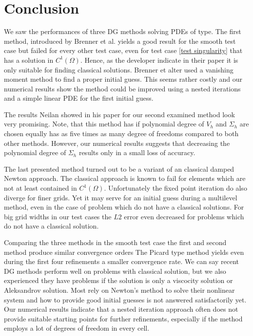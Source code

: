 \section{Conclusion}

We saw the performances of three DG methods solving PDEs of \MA type.
The first method, introduced by Brenner et al. \cite{BGN+2011} yields a good result for the smooth test case but failed for every other test case, even for test case \ref{test singularity} that has a solution in $C^1(\Omega)$. Hence, as the developer indicate in their paper it is only suitable for finding classical solutions.
Brenner et alter used a vanishing moment method to find a proper initial guess. This seems rather costly and our numerical results show the method could be improved using a nested iterations and a simple linear PDE for the first initial guess.

The results Neilan showed in his paper for our second examined method look very promising.
Note, that this method has if polynomial degree of $V_h$ and $\Sigma_h$ are chosen equally has as five times as many degree of freedoms compared to both other methods. However, our numerical results suggests that decreasing the polynomial degree of $\Sigma_h$ results only in a small loss of accuracy.

The last presented method turned out to be a variant of an classical damped Newton approach. 
The classical approach is known to fail for elements which are not at least contained in $C^1(\Omega)$. Unfortunately the fixed point iteration do also diverge for finer grids. Yet it may serve for an initial guess during a multilevel method, even in the case of problem which do not have a classical solutions. For big grid widths in our test cases the $L2$ error even decreased for problems which do not have a classical solution.

Comparing the three methods in the smooth test case the first and second method produce similar convergence orders %
The Picard type method yields even during the first four refinements a smaller convergence rate. We can say recent DG methods perform well on problems with classical solution, but we also experienced they have problems if the \MA solution is only a viscocity solution or Aleksandrov solution. Most rely on Newton's method to solve their nonlinear system and how to provide good initial guesses is not answered satisfactorily yet.
Our numerical results indicate that a nested iteration approach often does not provide suitable starting points for further refinements, especially if the method employs a lot of degrees of freedom in every cell.

